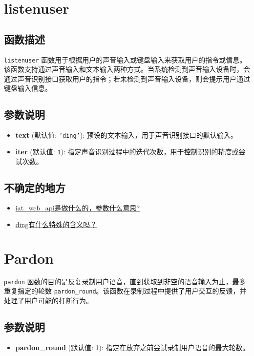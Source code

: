 \documentclass[]{article}
\begin{document}
	\section{listenuser}
	\subsection{函数描述}
	
	\texttt{listenuser} 函数用于根据用户的声音输入或键盘输入来获取用户的指令或信息。该函数支持通过声音输入和文本输入两种方式。当系统检测到声音输入设备时，会通过声音识别接口获取用户的指令；若未检测到声音输入设备，则会提示用户通过键盘输入信息。
	\subsection{参数说明}
	\begin{itemize}
		\item \textbf{text} (默认值: \texttt{'ding'}): 预设的文本输入，用于声音识别接口的默认输入。
		\item \textbf{iter} (默认值: \texttt{1}): 指定声音识别过程中的迭代次数，用于控制识别的精度或尝试次数。
	\end{itemize}
	\subsection{不确定的地方}
\begin{itemize}
	\item \underline{iat\_web\_api是做什么的，参数什么意思?}
	\item \underline{ding有什么特殊的含义吗？}
\end{itemize}
\section{Pardon}

\texttt{pardon} 函数的目的是反复录制用户语音，直到获取到非空的语音输入为止，最多重复指定的轮数 \texttt{pardon\_round}。该函数在录制过程中提供了用户交互的反馈，并处理了用户可能的打断行为。

\subsection{参数说明}
\begin{itemize}
	\item \textbf{pardon\_round} (默认值: 1): 指定在放弃之前尝试录制用户语音的最大轮数。
\end{itemize}
\end{document}
